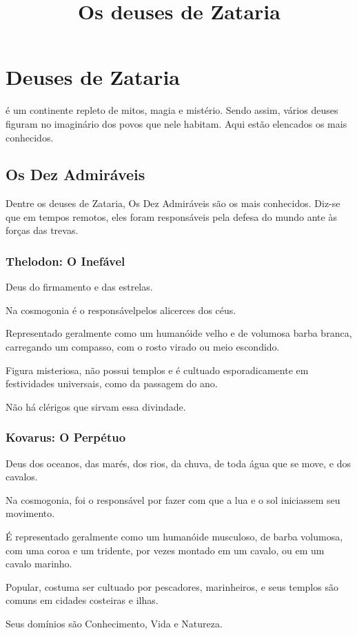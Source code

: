 \documentclass[letterpaper,twocolumn,openany]{dndbook}
\title{Os deuses de Zataria}
\begin{document}
	
	\chapter*{Deuses de Zataria}
	
	 é um continente repleto de mitos, magia e mistério. Sendo assim, vários deuses figuram no imaginário dos povos que nele habitam. Aqui estão elencados os mais conhecidos.
	
	\section{Os Dez Admiráveis}
	Dentre os deuses de Zataria, Os Dez Admiráveis são os mais conhecidos. Diz-se que em tempos remotos, eles foram responsáveis pela defesa do mundo ante às forças das trevas.
	
	\subsection{Thelodon: O Inefável}
	Deus do firmamento e das estrelas.
	\par Na cosmogonia é o responsávelpelos alicerces dos céus. 
	\par Representado geralmente como um humanóide velho e de volumosa barba branca, carregando um compasso, com o rosto virado ou meio escondido.
	\par Figura misteriosa, não possui templos e é cultuado esporadicamente em festividades universais, como da passagem do ano.
	\par Não há clérigos que sirvam essa divindade.
	
	\subsection{Kovarus: O Perpétuo}
	Deus dos oceanos, das marés, dos rios, da chuva, de toda água que se move, e dos cavalos.
	\par Na cosmogonia, foi o responsável por fazer com que a lua e o sol iniciassem seu movimento. 
	\par É representado geralmente como um humanóide musculoso, de barba volumosa, com uma coroa e um tridente, por vezes montado em um cavalo, ou em um cavalo marinho.
	\par Popular, costuma ser cultuado por pescadores, marinheiros, e seus templos são comuns em cidades costeiras e ilhas.
	 \par Seus domínios são Conhecimento, Vida e Natureza.
	
\end{document}
